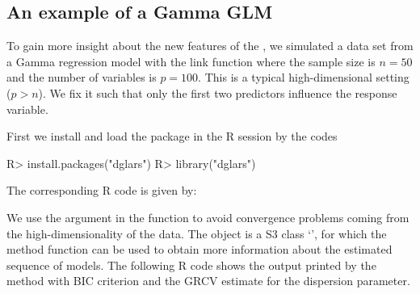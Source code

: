 \subsection[An example of a Gamma GLM]{An example of a Gamma GLM}
\label{subsec:examgamma}

To gain more insight about the new features of the ,  we simulated a data set from a Gamma regression model with the  link function where the sample size is $n=50$ and the number of variables is $p=100$. This is a typical high-dimensional setting ($p > n$). We fix it such that only the first two predictors influence the response variable. 

First we install and load the  package in the {R} session by the codes

\begin{example}
R> install.packages("dglars")
R> library("dglars")
\end{example}

The corresponding {R} code is given by:

We use the argument  in the function  to avoid convergence problems coming from the high-dimensionality of the data. The  object is a {S3} class `', for which the method function  can be used to obtain more information about the estimated sequence of models. The following {R} code shows the output printed by the  method with BIC criterion and the GRCV estimate for the dispersion parameter. 


